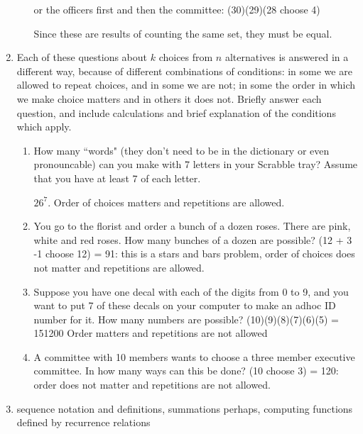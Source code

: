 \documentclass[12pt]{article}
\begin{document}
\begin{enumerate}
\begin{enumerate}
or the officers first and then the committee:  (30)(29)(28 choose 4)

Since these are results of counting the same set, they must be equal.

\end{enumerate}

\newpage

\item  Each of these questions about $k$ choices from $n$ alternatives is answered in a different way, because of different combinations of conditions:  in some we are allowed to repeat choices, and in some we are not;  in some the order in which we make choice matters and in others it does not.  Briefly answer each question, and include calculations and brief explanation of the conditions which apply.

\begin{enumerate}

\item  How many ``words" (they don't need to be in the dictionary or even pronouncable) can you make with 7 letters in your Scrabble tray?  Assume that you have at least 7 of each letter.

$26^7$.  Order of choices matters and repetitions are allowed.

\item  You go to the florist and order a bunch of a dozen roses.  There are pink, white and red roses.  How many bunches of a dozen are possible?  (12 + 3  -1 choose 12) = 91:  this is a stars and bars problem, order of choices does not matter and repetitions are allowed.

\item   Suppose you have one decal with each of the digits from 0 to 9, and you want to put 7 of these decals on your computer to make an adhoc ID number for it.  How many numbers are possible? (10)(9)(8)(7)(6)(5) = 151200
Order matters and repetitions are not allowed

\item   A committee with 10 members wants to choose a three member executive committee.  In how many ways can this be done?  (10 choose 3) = 120:  order does not matter and repetitions are not allowed.

\end{enumerate}

\newpage

\item  sequence notation and definitions, summations perhaps, computing functions defined by recurrence relations


\end{enumerate}
\end{document}
